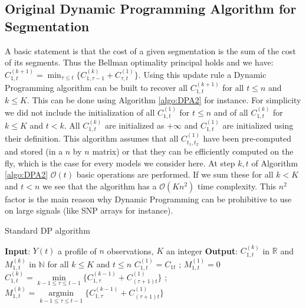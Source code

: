 \documentclass[11pt]{llncs}
\begin{document}
\subsection{Original Dynamic Programming Algorithm for Segmentation}

A basic statement is that the cost of a given segmentation is the sum of the cost of its segments. Thus the Bellman optimality principal holds and we have: $ C_{1, t}^{(k+1)} = \min_{\tau \leq t} \{ C_{1, \tau -1}^{(k)}  + C_{\tau, t}^{(1)} \} .$
Using this update rule  a Dynamic Programming algorithm can be built to recover all $ C_{1, t}^{(k+1)}$ for all $t \leq n$ and $k \leq K$.
This can be done using Algorithm \ref{algo:DPA2} for instance. 
For simplicity we did not include the initialization of all $C^{(1)}_{1,t}$ for $t \leq n$ and of all $C^{(k)}_{1,t}$ for $k \leq K$ and $t < k$.
All $C^{(k)}_{1,t}$ are initialized as $+\infty$ and $C^{(1)}_{1,t}$ are initialized using their definition.
This algorithm assumes that all $C_{t_1, t_2}^{(1)}$ have been pre-computed and stored (in 
a $n$ by $n$ matrix) or that they can be efficiently computed on the fly, which is the case for every models we consider here. At step $k, t$ of Algorithm \ref{algo:DPA2}  $\mathcal{O}(t)$ basic operations are performed. If we sum these for all $k < K$ and $t < n$  we see that the algorithm has a $\mathcal{O}(Kn^2)$ time complexity. This $n^2$ factor is the main reason why Dynamic Programming can be prohibitive to use on large signals (like SNP arrays for instance).
\begin{algorithm}
  \caption{Standard DP algorithm}\label{algo:DPA2}
  \begin{algorithmic}
    \State \textbf{Input}: $Y(t)$ a profile of $n$ observations, $K$ an integer
    \State \textbf{Output}: $C^{(k)}_{1,t}$ in $\mathbb{R}$ and $M^{(k)}_{1,t}$ in $\mathbb{N}$ for all $k \leq K$ and $t \leq n$
         \State $C^{(1)}_{1,t} = C_{1t}$ ; $M^{(1)}_{1,t} = 0$  
    \EndFor
     	\State $C^{(k)}_{1,t} = \underset{k-1 \leq \tau \leq t-1}{\min} \{ C^{(k-1)}_{1,\tau}+ C_{(\tau+1)t}^{(1)} \}$ ; $M^{(k)}_{1,t} =\underset{k-1 \leq \tau \leq t-1}{\operatorname{argmin}} \{ C^{(k-1)}_{1,\tau}+ C_{(\tau+1)t}^{(1)} \}$ 
        \EndFor   
     \EndFor
  \end{algorithmic}
\end{algorithm}
\end{document}
